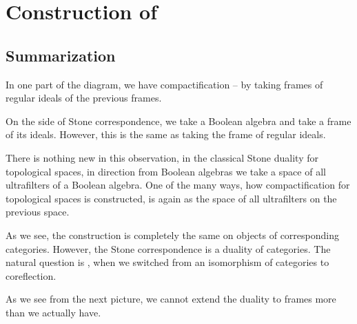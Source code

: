 \chapter{Construction of \R}

\section{Summarization}

In one part of the diagram, we have compactification -- by taking frames of regular ideals of the previous frames.

On the side of Stone correspondence, we take a Boolean algebra and take a frame of its ideals. However, this is the same as taking the frame of regular ideals.

There is nothing new in this observation, in the classical Stone duality for topological spaces, in direction from Boolean algebras we take a space of all ultrafilters of a Boolean algebra. One of the many ways, how compactification for topological spaces is constructed, is again as the space of all ultrafilters on the previous space.


As we see, the construction is completely the same on objects of corresponding categories. However, the Stone correspondence is a duality of categories. The natural question is , when we switched from an isomorphism of categories to coreflection.


As we see from the next picture, we cannot extend the duality to frames more than we actually have.

